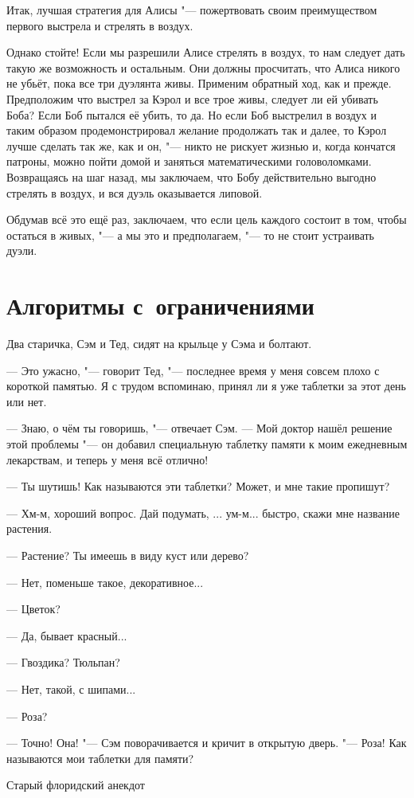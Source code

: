 \documentclass[twoside]{book}
\begin{document}
Итак, лучшая стратегия для Алисы "--- пожертвовать своим преимуществом
первого выстрела и стрелять в воздух. 


Однако стойте!
Если мы разрешили Алисе стрелять в воздух, то нам следует дать такую
же возможность и остальным.
Они должны просчитать, что Алиса никого не убьёт, пока все три дуэлянта живы. 
Применим обратный ход, как и прежде.
Предположим что выстрел за Кэрол и все трое живы,
следует ли ей убивать Боба? 
Если Боб пытался её убить, то да.
Но если Боб выстрелил в воздух и таким образом продемонстрировал желание продолжать так и далее,
то Кэрол лучше сделать так же, как и он, "---
никто не рискует жизнью и, когда кончатся патроны, можно пойти домой и заняться математическими головоломками.
Возвращаясь на шаг назад, мы заключаем, что Бобу действительно выгодно стрелять в воздух, и вся дуэль оказывается липовой.


Обдумав всё это ещё раз, заключаем, что если цель каждого состоит в
том, чтобы остаться в живых, "--- а мы это и предполагаем, "--- то не
стоит устраивать дуэли. 
\heart


\chapter{Алгоритмы с~ограничениями}

\thispagestyle{empty}


\setlength{}
\epigraph{%
Два старичка, Сэм и Тед, сидят на крыльце у Сэма и болтают.

--- Это ужасно, "--- говорит Тед, "--- последнее время у меня совсем плохо с короткой памятью.
Я с трудом вспоминаю, принял ли я уже таблетки за этот день или нет.

--- Знаю, о чём ты говоришь, "--- отвечает Сэм.
--- Мой доктор нашёл решение этой проблемы "--- он добавил специальную таблетку памяти к моим ежедневным лекарствам, и теперь у меня всё отлично!

--- Ты шутишь! Как называются эти таблетки? Может, и мне такие пропишут?

--- Хм-м, хороший вопрос.
Дай подумать, ... ум-м... быстро, скажи мне название растения.

--- Растение? Ты имеешь в виду куст или дерево?

--- Нет, поменьше такое, декоративное...

--- Цветок?

--- Да, бывает красный...

--- Гвоздика? Тюльпан?

--- Нет, такой, с шипами...

--- Роза?

--- Точно! Она! "--- Сэм поворачивается и кричит в открытую дверь. "--- Роза! Как называются мои таблетки для памяти?\vspace{1ex}}
{Старый флоридский анекдот}
\end{document}
